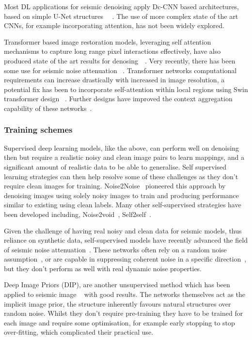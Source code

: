 \documentclass[project-plan]{report-template}
\begin{document}
Most DL applications for seismic denoising apply Dc-CNN based architectures, based on simple U-Net structures ~\cite{li2021seismicdccnn}~\cite{li2021seismicdlsims}. The use of more complex state of the art CNNs, for example incorporating attention, has not been widely explored.

Transformer based image restoration models, leveraging self attention mechanisms to capture long range pixel interactions effectively, have also produced state of the art results for denosing~\cite{zamir2021restormer}~\cite{wang2022uformer}. Very recently, there has been some use for seismic noise attenuation ~\cite{lei2024swin}. Transformer networks computational requirements can increase drastically with increased in image resolution, a potential fix has been to incorporate  self-attention within local regions using Swin transformer design ~\cite{wang2022uformer}. Further designs have improved the context aggregation capability of these networks~\cite{zamir2021restormer}.


\subsubsection{Training schemes}
Supervised deep learning models, like the above, can perform well on denoising then but require a realistic noisy and clean image pairs to learn mappings, and a significant amount of realistic data to be able to generalise. Self supervised learning strategies can then help resolve some of these challenges as they don't require clean images for training.
Noise2Noise~\cite{lehtinen2018noise2noise} pioneered this approach by denoising images using solely noisy images to train and producing performance similar to existing using clean labels. Many other self-supervised strategies have been developed including, Noise2void~\cite{krull2019noise2void}, Self2self~\cite{quan2020self2self}.

Given the challenge of having real noisy and clean data for seismic models, thus reliance on synthetic data, self-supervised models have recently advanced the field of seismic noise attenuation~\cite{liu2023tracewise}. These networks often rely on a random noise assumption~\cite{birnie2021potential}, or are capable in suppressing coherent noise in  a specific direction~\cite{liu2023tracewise}, but they don't perform as well with real dynamic noise properties.

Deep Image Priors (DIP), are another unsupervised method which has been applied to seismic image ~\cite{lie2024seismicdip} with good results. The networks themselves act as the implicit image prior, the structure inherently favours natural structures over random noise. Whilst they don't require pre-training they have to be trained for each image and require some optimisation, for example early stopping to stop over-fitting, which complicated their practical use.
\end{document}
